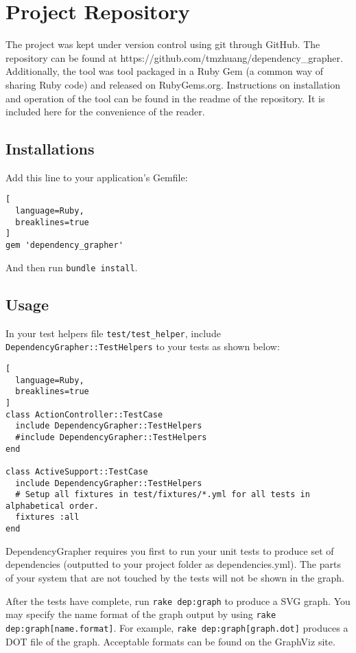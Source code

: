 \appendix

\chapter{Project Repository}
\label{chap:repo}
The project was kept under version control using git through GitHub. The repository can be found at https://github.com/tmzhuang/dependency\_grapher. Additionally, the tool was tool packaged in a Ruby Gem (a common way of sharing Ruby code) and released on RubyGems.org. Instructions on installation and operation of the tool can be found in the readme of the repository. It is included here for the convenience of the reader.

\section{Installations}
Add this line to your application's Gemfile:
\begin{lstlisting}[
  language=Ruby,
  breaklines=true
]
gem 'dependency_grapher'
\end{lstlisting}
And then run {\lstinline|bundle install|}. 

\section{Usage}
In your test helpers file {\lstinline|test/test_helper|}, include {\lstinline|DependencyGrapher::TestHelpers|} to your tests as shown below:
\begin{lstlisting}[
  language=Ruby,
  breaklines=true
]
class ActionController::TestCase
  include DependencyGrapher::TestHelpers
  #include DependencyGrapher::TestHelpers
end

class ActiveSupport::TestCase
  include DependencyGrapher::TestHelpers
  # Setup all fixtures in test/fixtures/*.yml for all tests in alphabetical order.
  fixtures :all
end
\end{lstlisting}
DependencyGrapher requires you first to run your unit tests to produce set of dependencies (outputted to your project folder as dependencies.yml). The parts of your system that are not touched by the tests will not be shown in the graph.

After the tests have complete, run {\lstinline|rake dep:graph|} to produce a SVG graph. You may specify the name format of the graph output by using {\lstinline|rake dep:graph[name.format]|}. For example, {\lstinline|rake dep:graph[graph.dot]|} produces a DOT file of the graph. Acceptable formats can be found on the GraphViz site.
